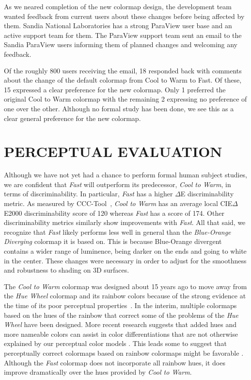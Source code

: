 \documentclass{IEEEcsmag}
\newcommand*{\colormap}[1]{\textsl{#1}\xspace}
\newcommand*{\huewheel}{\colormap{Hue Wheel}}
\newcommand*{\coolwarm}{\colormap{Cool to Warm}}
\newcommand*{\blueorange}{\colormap{Blue-Orange Diverging}}
\newcommand*{\fast}{\colormap{Fast}}
\begin{document}
As we neared completion of the new colormap design, the development team wanted feedback from current users about these changes before being affected by them.
Sandia National Laboratories has a strong ParaView user base and an active support team for them.
The ParaView support team sent an email to the Sandia ParaView users informing them of planned changes and welcoming any feedback.

Of the roughly 800 users receiving the email, 18 responded back with comments about the change of the default colormap from Cool to Warm to Fast.
Of these, 15 expressed a clear preference for the new colormap.
Only 1 preferred the original Cool to Warm colormap with the remaining 2 expressing no preference of one over the other.
Although no formal study has been done, we see this as a clear general preference for the new colormap.


\section{PERCEPTUAL EVALUATION}

Although we have not yet had a chance to perform formal human subject studies, we are confident that \fast will outperform its predecessor, \coolwarm, in terms of discriminability.
In particular, \fast has a higher $\Delta$E discriminability metric.
As measured by CCC-Tool~\cite{Nardini2021}, \coolwarm has an average local CIE$\Delta$E2000 discriminability score of 120 whereas \fast has a score of 174. Other discriminability metrics similarly show improvements with \fast.
All that said, we recognize that \fast%
likely performs less well in general than the \blueorange colormap it is based on. This is because Blue-Orange divergent contains a wider range of luminence, being darker on the ends and going to white in the center.
These changes were necessary in order to adjust for the smoothness and robustness to shading on 3D surfaces.

The \coolwarm colormap was designed about 15 years ago to move away from the \huewheel colormap and its rainbow colors because of the strong evidence at the time of its poor perceptual properties~\cite{Rogowitz1998,Borland2007,Ware1988,Light2004}.
In the interim, multiple colormaps based on the hues of the rainbow that correct some of the problems of the \huewheel have been designed.
More recent research suggests that added hues and more nameable colors can assist in color differentiations that are not otherwise explained by our perceptual color models \cite{Reda2021}.
This leads some to suggest that perceptually correct colormaps based on rainbow colormaps might be favorable \cite{Ware2023}.
Although the \fast colormap does not incorporate all rainbow hues, it does improve dramatically over the hues provided by \coolwarm. 
\end{document}
